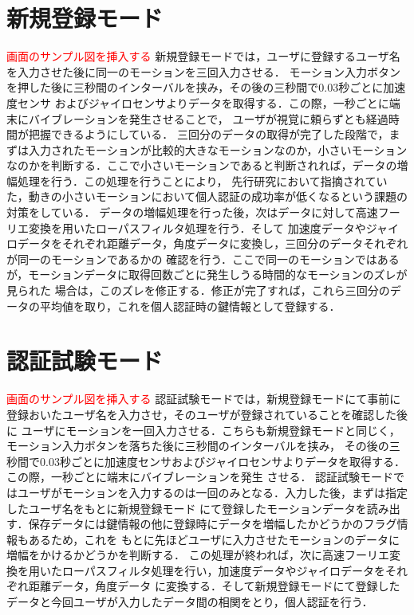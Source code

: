 \documentclass[11pt]{jreport}
\begin{document}
	\section{新規登録モード}
    \textcolor{red}{画面のサンプル図を挿入する}
	新規登録モードでは，ユーザに登録するユーザ名を入力させた後に同一のモーションを三回入力させる．
    モーション入力ボタンを押した後に三秒間のインターバルを挟み，その後の三秒間で0.03秒ごとに加速度センサ
    およびジャイロセンサよりデータを取得する．この際，一秒ごとに端末にバイブレーションを発生させることで，
    ユーザが視覚に頼らずとも経過時間が把握できるようにしている．
    三回分のデータの取得が完了した段階で，まずは入力されたモーションが比較的大きなモーションなのか，小さいモーション
    なのかを判断する．ここで小さいモーションであると判断されれば，データの増幅処理を行う．この処理を行うことにより，
    先行研究において指摘されていた，動きの小さいモーションにおいて個人認証の成功率が低くなるという課題の対策をしている．
    データの増幅処理を行った後，次はデータに対して高速フーリエ変換を用いたローパスフィルタ処理を行う．そして
    加速度データやジャイロデータをそれぞれ距離データ，角度データに変換し，三回分のデータそれぞれが同一のモーションであるかの
    確認を行う．ここで同一のモーションではあるが，モーションデータに取得回数ごとに発生しうる時間的なモーションのズレが見られた
   場合は，このズレを修正する．修正が完了すれば，これら三回分のデータの平均値を取り，これを個人認証時の鍵情報として登録する．
	\section{認証試験モード}
    \textcolor{red}{画面のサンプル図を挿入する}
	認証試験モードでは，新規登録モードにて事前に登録おいたユーザ名を入力させ，そのユーザが登録されていることを確認した後に
    ユーザにモーションを一回入力させる．こちらも新規登録モードと同じく，モーション入力ボタンを落ちた後に三秒間のインターバルを挟み，
    その後の三秒間で0.03秒ごとに加速度センサおよびジャイロセンサよりデータを取得する．この際，一秒ごとに端末にバイブレーションを発生
    させる．
    認証試験モードではユーザがモーションを入力するのは一回のみとなる．入力した後，まずは指定したユーザ名をもとに新規登録モード
    にて登録したモーションデータを読み出す．保存データには鍵情報の他に登録時にデータを増幅したかどうかのフラグ情報もあるため，これを
    もとに先ほどユーザに入力させたモーションのデータに増幅をかけるかどうかを判断する．
    この処理が終われば，次に高速フーリエ変換を用いたローパスフィルタ処理を行い，加速度データやジャイロデータをそれぞれ距離データ，角度データ
    に変換する．そして新規登録モードにて登録したデータと今回ユーザが入力したデータ間の相関をとり，個人認証を行う．
\end{document}
